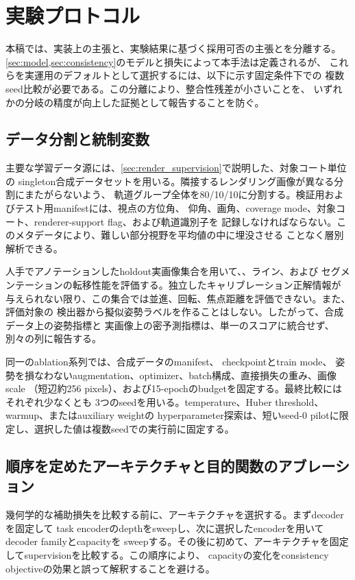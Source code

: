 \section{実験プロトコル}
\label{sec:experiments}

本稿では、実装上の主張と、実験結果に基づく採用可否の主張とを分離する。
\cref{sec:model,sec:consistency}のモデルと損失によって本手法は定義されるが、
これらを実運用のデフォルトとして選択するには、以下に示す固定条件下での
複数seed比較が必要である。この分離により、整合性残差が小さいことを、
いずれかの分岐の精度が向上した証拠として報告することを防ぐ。

\subsection{データ分割と統制変数}

主要な学習データ源には、\cref{sec:render_supervision}で説明した、対象コート単位の
singleton合成データセットを用いる。隣接するレンダリング画像が異なる分割にまたがらないよう、
軌道グループ全体を80/10/10に分割する。検証用およびテスト用manifestには、視点の方位角、
仰角、画角、coverage mode、対象コート、renderer-support flag、および軌道識別子を
記録しなければならない。このメタデータにより、難しい部分視野を平均値の中に埋没させる
ことなく層別解析できる。

人手でアノテーションしたholdout実画像集合を用いて、\KP{}、ライン、および
セグメンテーションの転移性能を評価する。独立したキャリブレーション正解情報が
与えられない限り、この集合では並進、回転、焦点距離を評価できない。また、評価対象の
検出器から擬似姿勢ラベルを作ることはしない。したがって、合成データ上の姿勢指標と
実画像上の密予測指標は、単一のスコアに統合せず、別々の列に報告する。

同一のablation系列では、合成データのmanifest、\DINO{} checkpointとtrain mode、
姿勢を損なわないaugmentation、optimizer、batch構成、直接損失の重み、画像scale
（短辺約256 pixels）、および15-epochのbudgetを固定する。最終比較にはそれぞれ少なくとも
3つのseedを用いる。temperature、Huber threshold、warmup、またはauxiliary weightの
hyperparameter探索は、短いseed-0 pilotに限定し、選択した値は複数seedでの実行前に固定する。

\subsection{順序を定めたアーキテクチャと目的関数のアブレーション}

幾何学的な補助損失を比較する前に、アーキテクチャを選択する。まずdecoderを固定して
task encoderのdepthをsweepし、次に選択したencoderを用いてdecoder familyとcapacityを
sweepする。その後に初めて、アーキテクチャを固定してsupervisionを比較する。この順序により、
capacityの変化をconsistency objectiveの効果と誤って解釈することを避ける。

